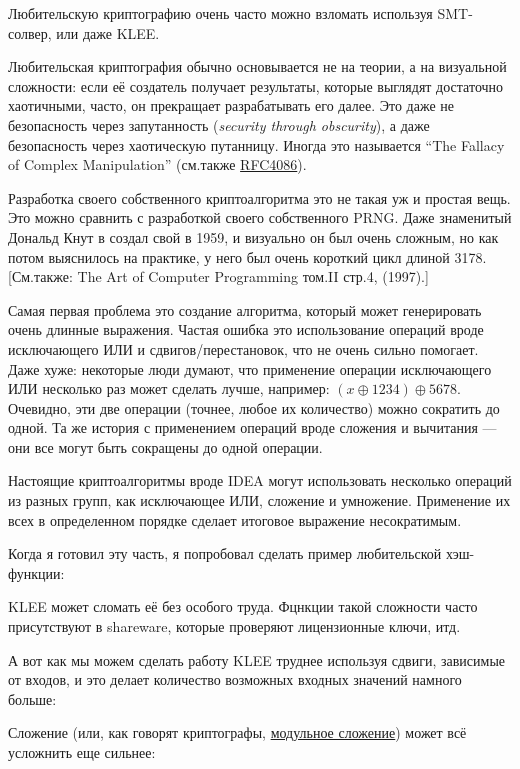 Любительскую криптографию очень часто можно взломать используя SMT-солвер, или даже KLEE.

Любительская криптография обычно основывается не на теории, а на визуальной сложности:
если её создатель получает результаты, которые выглядят достаточно хаотичными, часто, он прекращает разрабатывать его далее.
Это даже не безопасность через запутанность (\textit{security through obscurity}),
а даже безопасность через хаотическую путанницу.
Иногда это называется ``The Fallacy of Complex Manipulation''
(см.также \href{https://tools.ietf.org/html/rfc4086}{RFC4086}).

Разработка своего собственного криптоалгоритма это не такая уж и простая вещь.
Это можно сравнить с разработкой своего собственного \ac{PRNG}.
Даже знаменитый Дональд Кнут в создал свой в 1959, и визуально он был очень сложным,
но как потом выяснилось на практике, у него был очень короткий цикл длиной 3178.
[См.также: The Art of Computer Programming том.II стр.4, (1997).]

Самая первая проблема это создание алгоритма, который может генерировать очень длинные выражения.
Частая ошибка это использование операций вроде исключающего ИЛИ и сдвигов/перестановок, что не очень сильно помогает.
Даже хуже: некоторые люди думают, что применение операции исключающего ИЛИ несколько раз может сделать лучше,
например: $(x \oplus 1234) \oplus 5678$.
Очевидно, эти две операции (точнее, любое их количество) можно сократить до одной.
Та же история с применением операций вроде сложения и вычитания --- они все могут быть сокращены до одной операции.

Настоящие криптоалгоритмы вроде IDEA могут использовать несколько операций из разных групп, как исключающее ИЛИ,
сложение и умножение.
Применение их всех в определенном порядке сделает итоговое выражение несократимым.

Когда я готовил эту часть, я попробовал сделать пример любительской хэш-функции:



KLEE может сломать её без особого труда.
Фцнкции такой сложности часто присутствуют в shareware, которые проверяют лицензионные ключи, итд.

А вот как мы можем сделать работу KLEE труднее используя сдвиги, зависимые от входов,
и это делает количество возможных входных значений намного больше:



Сложение (или, как говорят криптографы, \href{https://yurichev.com/blog/modulo/}{модульное сложение}) может всё усложнить
еще сильнее:

